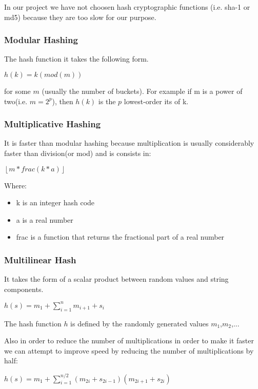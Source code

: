 \documentclass[12pt]{article}
\begin{document}
In our project we have not choosen hash cryptographic functions (i.e. sha-1 or md5) because they are too slow for our purpose.

 
\subsubsection{Modular Hashing}

The hash function it takes the following form. 

\begin{center} $h(k) = k (mod (m))$ \end{center}

for some $m$ (usually the number of buckets). For example if m is a power of two(i.e. $m = 2^p$), then $h(k)$ is the $p$ lowest-order its of k. 

\subsubsection{Multiplicative Hashing}

It is faster than modular hashing because multiplication is usually considerably faster than division(or mod) and is consists in:
\begin{center}
 $ \left \lfloor m* frac(k*a) \right \rfloor$
\end{center}
Where:
\begin{itemize}
\item k is an integer hash code
\item a is a real number
\item frac is a function that returns the fractional part of a real number
\end{itemize}


\subsubsection{Multilinear Hash}
It takes the form of a scalar product between random values and string components.
\begin{center}
$h(s) = m_1 + \sum_{i=1}^{n} m_{i+1} + s_i$
\end{center}
The hash function $h$ is defined by the randomly generated values $m_1$,$m_2$,...

Also in order to reduce the number of multiplications in order to make it faster we can attempt to improve speed by reducing the number of multiplications by half: 
\begin{center}
 $h(s) = m_1 + \sum_{i=1}^{n/2} (m_{2i} + s_{2i-1})(m_{2i+1} + s_{2i})$
\end{center}
\end{document}
